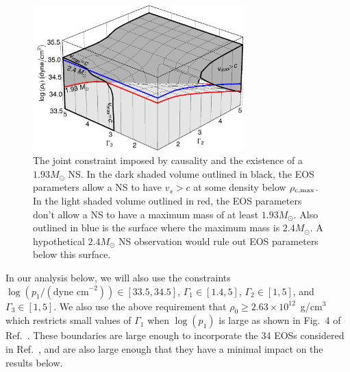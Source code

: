 \documentclass[twocolumn,prd,amssymb,aps,nofootinbib,showpacs,epsf]{revtex4}
\begin{document}
\begin{figure}[!htb]
\begin{center}
\includegraphics[width=3.2in]{mvs3d.png}
\caption{The joint constraint imposed by causality and the existence of a $1.93M_\odot$ NS. In the dark shaded volume outlined in black, the EOS parameters allow a NS to have $v_s>c$ at some density below $\rho_{\rm c, max}$. In the light shaded volume outlined in red, the EOS parameters don't allow a NS to have a maximum mass of at least $1.93M_\odot$. Also outlined in blue is the surface where the maximum mass is $2.4M_\odot$. A hypothetical $2.4M_\odot$ NS observation would rule out EOS parameters below this surface.}
\label{fig:mvs3d}
\end{center}
\end{figure}

In our analysis below, we will also use the constraints $\log(p_1/(\text{dyne cm}^{-2})) \in [33.5, 34.5]$, $\Gamma_1 \in [1.4, 5]$, $\Gamma_2 \in [1, 5]$, and $\Gamma_3 \in [1, 5]$. We also use the above requirement that $\rho_0 \ge 2.63\times 10^{12}$~g/cm$^3$ which restricts small values of $\Gamma_1$ when $\log(p_1)$ is large as shown in Fig.~4 of Ref.~\cite{ReadLackey2009}. These boundaries are large enough to incorporate the 34 EOSs considered in Ref.~\cite{ReadLackey2009}, and are also large enough that they have a minimal impact on the results below.

\end{document}
